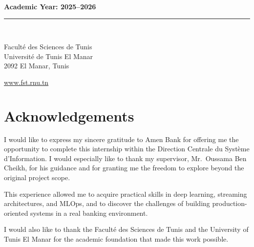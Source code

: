 \documentclass[a4paper,12pt]{report}
\begin{document}
\begin{titlepage}
\begin{center}
        {\large \textbf{Academic Year: 2025--2026}}
        
        \vfill
        
        \rule{\textwidth}{1pt}\\[0.2cm]
        \begin{minipage}{0.45\textwidth}
            \small
            Faculté des Sciences de Tunis\\
            Université de Tunis El Manar\\
            2092 El Manar, Tunis
        \end{minipage}
        \hfill
        \begin{minipage}{0.45\textwidth}
            \raggedleft\small
            \url{www.fst.rnu.tn}
        \end{minipage}
        
    \end{center}
\end{titlepage}


\chapter*{Acknowledgements}

I would like to express my sincere gratitude to Amen Bank for offering
me the opportunity to complete this internship within the Direction
Centrale du Système d'Information. I would especially like to thank
my supervisor, Mr.\ Oussama Ben Cheikh, for his guidance and for
granting me the freedom to explore beyond the original project scope.

This experience allowed me to acquire practical skills in deep learning,
streaming architectures, and MLOps, and to discover the challenges of
building production-oriented systems in a real banking environment.

I would also like to thank the Faculté des Sciences de Tunis and the
University of Tunis El Manar for the academic foundation that made
this work possible.

\newpage

\tableofcontents
\newpage

\listoffigures
{}
\newpage
\end{document}
